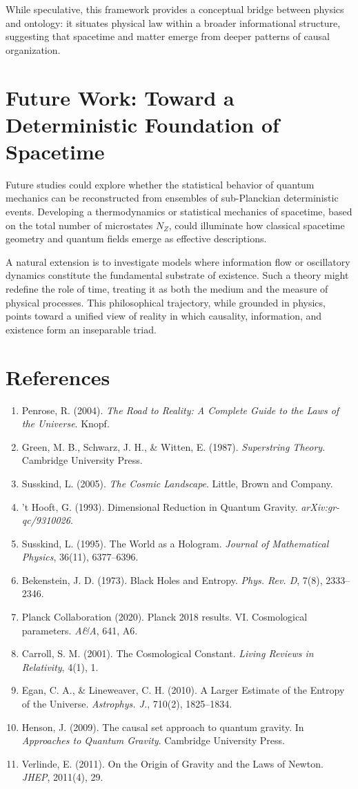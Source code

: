 \documentclass[12pt]{article}
\begin{document}
While speculative, this framework provides a conceptual bridge between physics and ontology: it situates physical law within a broader informational structure, suggesting that spacetime and matter emerge from deeper patterns of causal organization.

\section{Future Work: Toward a Deterministic Foundation of Spacetime}
Future studies could explore whether the statistical behavior of quantum mechanics can be reconstructed from ensembles of sub-Planckian deterministic events. Developing a thermodynamics or statistical mechanics of spacetime, based on the total number of microstates $N_Z$, could illuminate how classical spacetime geometry and quantum fields emerge as effective descriptions.

A natural extension is to investigate models where information flow or oscillatory dynamics constitute the fundamental substrate of existence. Such a theory might redefine the role of time, treating it as both the medium and the measure of physical processes. This philosophical trajectory, while grounded in physics, points toward a unified view of reality in which causality, information, and existence form an inseparable triad.

\section*{References}
\begin{enumerate}
\item Penrose, R. (2004). \textit{The Road to Reality: A Complete Guide to the Laws of the Universe}. Knopf.
\item Green, M. B., Schwarz, J. H., \& Witten, E. (1987). \textit{Superstring Theory}. Cambridge University Press.
\item Susskind, L. (2005). \textit{The Cosmic Landscape}. Little, Brown and Company.
\item 't Hooft, G. (1993). Dimensional Reduction in Quantum Gravity. \textit{arXiv:gr-qc/9310026}.
\item Susskind, L. (1995). The World as a Hologram. \textit{Journal of Mathematical Physics}, 36(11), 6377--6396.
\item Bekenstein, J. D. (1973). Black Holes and Entropy. \textit{Phys. Rev. D}, 7(8), 2333--2346.
\item Planck Collaboration (2020). Planck 2018 results. VI. Cosmological parameters. \textit{A\&A}, 641, A6.
\item Carroll, S. M. (2001). The Cosmological Constant. \textit{Living Reviews in Relativity}, 4(1), 1.
\item Egan, C. A., \& Lineweaver, C. H. (2010). A Larger Estimate of the Entropy of the Universe. \textit{Astrophys. J.}, 710(2), 1825--1834.
\item Henson, J. (2009). The causal set approach to quantum gravity. In \textit{Approaches to Quantum Gravity}. Cambridge University Press.
\item Verlinde, E. (2011). On the Origin of Gravity and the Laws of Newton. \textit{JHEP}, 2011(4), 29.
\end{enumerate}
\end{document}

